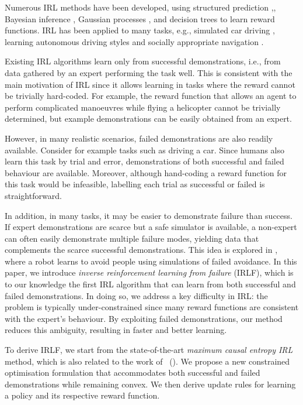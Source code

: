 \documentclass[letterpaper]{article}
\newcommand{\citet}[1]{\citeauthor{#1}~(\citeyear{#1})}
\begin{document}
Numerous IRL methods have been developed, using structured prediction \cite{ratliff2006maximum},\cite{klein2012inverse}, Bayesian inference \cite{ramachandran2007bayesian}, Gaussian processes \cite{levine2011nonlinear}, and decision trees \cite{ratliff2007boosting} to learn reward functions. IRL has been applied to many tasks, e.g., simulated car driving \cite{abbeel2004apprenticeship}, learning autonomous driving styles \cite{kuderer2015learning} and socially appropriate navigation \cite{henry2010learning,vasquez2014inverse}. 

Existing IRL algorithms learn only from successful demonstrations, i.e., from data gathered by an expert performing the task well. This is consistent with the main motivation of IRL since it allows learning in tasks where the reward cannot be trivially hard-coded.  For example, the reward function that allows an agent to perform complicated manoeuvres while flying a helicopter cannot be trivially determined, but example demonstrations can be easily obtained from an expert.

However, in many realistic scenarios, failed demonstrations are also readily available.  Consider for example tasks such as driving a car.  Since humans also learn this task by trial and error, demonstrations of both successful and failed behaviour are available. Moreover, although hand-coding a reward function for this task would be infeasible, labelling each trial as successful or failed is straightforward.

In addition, in many tasks, it may be easier to demonstrate failure than success.  If expert demonstrations are scarce but a safe simulator is available, a non-expert can often easily demonstrate multiple failure modes, yielding data that complements the scarce successful demonstrations. This idea is explored in \cite{choi2015}, where a robot learns to avoid people using simulations of failed avoidance.
In this paper, we introduce \emph{inverse reinforcement learning from failure} (IRLF), which is to our knowledge the first IRL algorithm that can learn from both successful and failed demonstrations. In doing so, we address a key difficulty in IRL: the problem is typically under-constrained since many reward functions are consistent with the expert's behaviour.  By exploiting failed demonstrations, our method reduces this ambiguity, resulting in faster and better learning.

To derive IRLF, we start from the state-of-the-art \emph{maximum causal entropy IRL} \cite{ziebart2008maximum,ziebart2010modelingthesis} method, which is also related to the work of \citet{babes2011apprenticeship}. We propose a new constrained optimisation formulation that accommodates both successful and failed demonstrations while remaining convex.  We then derive update rules for learning a policy and its respective reward function.
\end{document}
